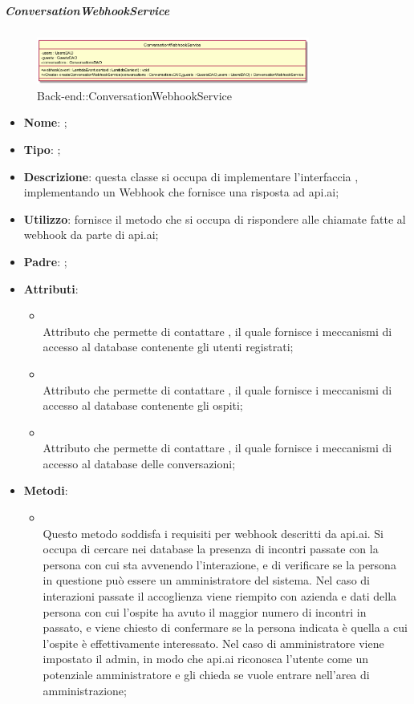 \hypertarget{ConversationWebhookService_label}{\subparagraph{ConversationWebhookService}}
\begin{figure}[h]
	\centering
	\includegraphics[width=0.80\textwidth,height=\textheight,keepaspectratio]{images/ClassConversationWebhookService.png}
	\caption{Back-end::ConversationWebhookService}
\end{figure}
\begin{itemize}
	\item \textbf{Nome}: ;
	\item \textbf{Tipo}: ;
	\item \textbf{Descrizione}: questa classe si occupa di implementare l'interfaccia , implementando un Webhook che fornisce una risposta ad api.ai;
	\item \textbf{Utilizzo}: fornisce il metodo che si occupa di rispondere alle chiamate fatte al webhook da parte di api.ai;
	\item \textbf{Padre}: ;
	\item \textbf{Attributi}:
	\begin{itemize}
		\item[]  \\
		Attributo che permette di contattare , il quale fornisce i meccanismi di accesso al database contenente gli utenti registrati;
		\item[]  \\
		Attributo che permette di contattare , il quale fornisce i meccanismi di accesso al database contenente gli ospiti;
		\item[]  \\
		Attributo che permette di contattare , il quale fornisce i meccanismi di accesso al database delle conversazioni;
	\end{itemize}
	\item \textbf{Metodi}:
	\begin{itemize}
		\item[]  \\		Questo metodo soddisfa i requisiti per webhook descritti da api.ai. Si occupa di cercare nei database la presenza di incontri passate con la persona con cui sta avvenendo l'interazione, e di verificare se la persona in questione può essere un amministratore del sistema. Nel caso di interazioni passate il  accoglienza viene riempito con azienda e dati della persona con cui l'ospite ha avuto il maggior numero di incontri in passato, e viene chiesto di confermare se la persona indicata è quella a cui l'ospite è effettivamente interessato. Nel caso di amministratore viene impostato il  admin, in modo che api.ai riconosca l'utente come un potenziale amministratore e gli chieda se vuole entrare nell'area di amministrazione;\\

\end{itemize}
\end{itemize}
